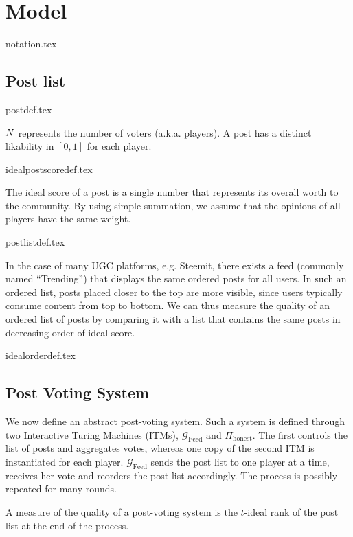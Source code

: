 \section{Model}
  {notation.tex}

  \subsection{Post list}
    {postdef.tex}

    \noindent $N$ represents the number of voters (a.k.a. players). A
    post has a distinct likability in $\left[0, 1\right]$ for each player.

    {idealpostscoredef.tex}

    \noindent The ideal score of a post is a single number that represents its
    overall worth to the community. By using simple summation, we assume that
    the opinions of all players have the same weight.

    {postlistdef.tex}

    \noindent In the case of many UGC platforms, e.g. Steemit, there exists a
    feed (commonly named ``Trending'') that displays the same ordered posts for
    all users. In such an ordered list, posts placed closer to the top are more
    visible, since users typically consume content from top to bottom. We can
    thus measure the quality of an ordered list of posts by comparing it with a
    list that contains the same posts in decreasing order of ideal score.

    {idealorderdef.tex}

  \subsection{Post Voting System}

    We now define an abstract post-voting system. Such a system is defined
    through two Interactive Turing Machines (ITMs),
    $\mathcal{G}_{\mathrm{Feed}}$ and $\Pi_{\mathrm{honest}}$. The first
    controls the list of posts and aggregates votes, whereas one copy of the
    second ITM is instantiated for each player. $\mathcal{G}_{\mathrm{Feed}}$
    sends the post list to one player at a time, receives her vote and reorders
    the post list accordingly. The process is possibly repeated for many rounds.

    A measure of the quality of a post-voting system is the $t$-ideal rank of
    the post list at the end of the process.


